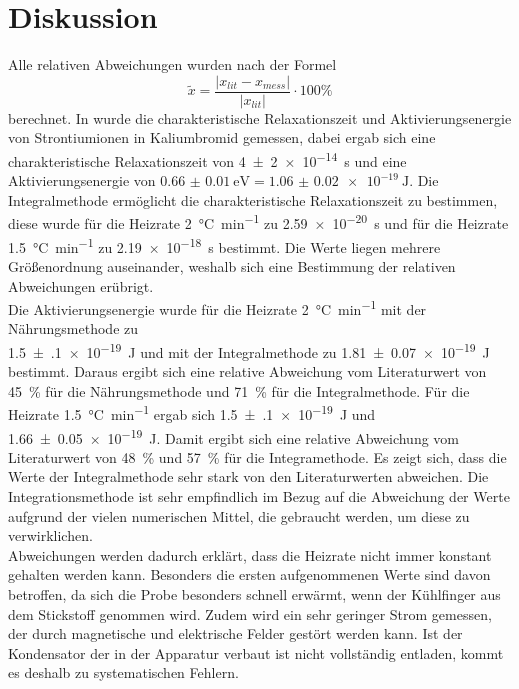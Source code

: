 \section{Diskussion}
\label{sec:Diskussion}
Alle relativen Abweichungen wurden nach der Formel
\begin{equation*}
  \tilde{x} = \frac{ \lvert x_{lit} - x_{mess} \rvert}{\lvert x_{lit} \rvert}
  \cdot 100 \%
\end{equation*}
berechnet. 
In \cite{paper} wurde die charakteristische Relaxationszeit und Aktivierungsenergie von 
Strontiumionen in Kaliumbromid gemessen, dabei ergab sich eine charakteristische Relaxationszeit 
von \SI{4(2)e-14}{\second} und eine Aktivierungsenergie von 
$\SI{0.66(1)}{\eV} = \SI{1.06(2)e-19}{\joule}$.
Die Integralmethode ermöglicht die charakteristische Relaxationszeit zu bestimmen, diese wurde 
für die Heizrate \SI{2}{\celsius\per\minute} zu \SI{2.59e-20}{\second} und für die Heizrate 
\SI{1.5}{\celsius\per\minute} zu \SI{2.19e-18}{\second} bestimmt. Die Werte liegen mehrere 
Größenordnung auseinander, weshalb sich eine Bestimmung der relativen Abweichungen erübrigt.\\
Die Aktivierungsenergie wurde für die Heizrate \SI{2}{\celsius\per\minute} mit der Nährungsmethode 
zu \\\SI{1.5(1)e-19}{\joule} und mit der Integralmethode zu \SI{1.81(7)e-19}{\joule} bestimmt. 
Daraus ergibt sich eine relative Abweichung vom Literaturwert von \SI{45}{\percent} 
für die Nährungsmethode und \SI{71}{\percent} für die Integralmethode. Für die Heizrate 
\SI{1.5}{\celsius\per\minute} ergab sich \SI{1.5(1)e-19}{\joule} und \SI{1.66(5)e-19}{\joule}. 
Damit ergibt sich eine relative Abweichung vom Literaturwert von \SI{48}{\percent} und 
\SI{57}{\percent} für die Integramethode. Es zeigt sich, dass die Werte der Integralmethode 
sehr stark von den Literaturwerten abweichen. Die Integrationsmethode ist sehr 
empfindlich im Bezug auf die Abweichung der Werte aufgrund der vielen numerischen Mittel, 
die gebraucht werden, um diese zu verwirklichen.\\
Abweichungen werden dadurch erklärt, dass die Heizrate nicht immer konstant gehalten werden kann. 
Besonders die ersten aufgenommenen Werte sind davon betroffen, da sich die Probe besonders schnell 
erwärmt, wenn der Kühlfinger aus dem Stickstoff genommen wird. Zudem wird ein sehr geringer Strom 
gemessen, der durch magnetische und elektrische Felder gestört werden kann. 
Ist der Kondensator der in 
der Apparatur verbaut ist nicht vollständig entladen, kommt es deshalb zu systematischen Fehlern. 

